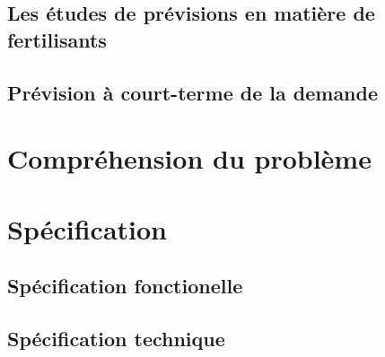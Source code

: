 \subsection{Les études de prévisions en matière de fertilisants}
\subsection{Prévision à court-terme de la demande}
\section{Compréhension du problème}
\section{Spécification}
	\subsection{Spécification fonctionelle}
	\subsection{Spécification technique}